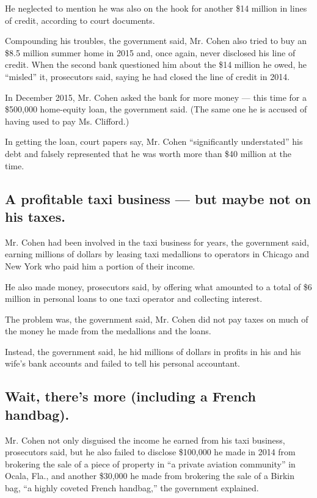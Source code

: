 He neglected to mention he was also on the hook for another \$14 million
in lines of credit, according to court documents.

Compounding his troubles, the government said, Mr. Cohen also tried to
buy an \$8.5 million summer home in 2015 and, once again, never
disclosed his line of credit. When the second bank questioned him about
the \$14 million he owed, he ``misled'' it, prosecutors said, saying he
had closed the line of credit in 2014.

In December 2015, Mr. Cohen asked the bank for more money --- this time
for a \$500,000 home-equity loan, the government said. (The same one he
is accused of having used to pay Ms. Clifford.)

In getting the loan, court papers say, Mr. Cohen ``significantly
understated'' his debt and falsely represented that he was worth more
than \$40 million at the time.

\hypertarget{a-profitable-taxi-business--but-maybe-not-on-his-taxes}{%
\subsection{A profitable taxi business --- but maybe not on his
taxes.}\label{a-profitable-taxi-business--but-maybe-not-on-his-taxes}}

Mr. Cohen had been involved in the taxi business for years, the
government said, earning millions of dollars by leasing taxi medallions
to operators in Chicago and New York who paid him a portion of their
income.

He also made money, prosecutors said, by offering what amounted to a
total of \$6 million in personal loans to one taxi operator and
collecting interest.

The problem was, the government said, Mr. Cohen did not pay taxes on
much of the money he made from the medallions and the loans.

Instead, the government said, he hid millions of dollars in profits in
his and his wife's bank accounts and failed to tell his personal
accountant.

\hypertarget{wait-theres-more-including-a-french-handbag}{%
\subsection{Wait, there's more (including a French
handbag).}\label{wait-theres-more-including-a-french-handbag}}

Mr. Cohen not only disguised the income he earned from his taxi
business, prosecutors said, but he also failed to disclose \$100,000 he
made in 2014 from brokering the sale of a piece of property in ``a
private aviation community'' in Ocala, Fla., and another \$30,000 he
made from brokering the sale of a Birkin bag, ``a highly coveted French
handbag,'' the government explained.

